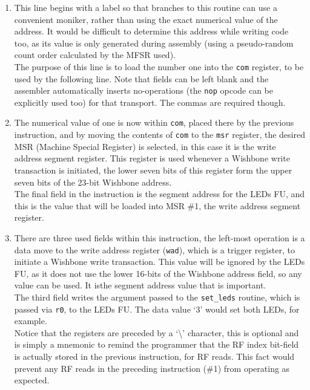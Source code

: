 \begin{enumerate}
  \item This line begins with a label so that branches to this routine can use
  a convenient moniker, rather than using the exact numerical value of the
  address. It would be difficult to determine this address while writing code 
  too, as its value is only generated during assembly (using a pseudo-random
  count order calculated by the MFSR used).  \\
  The purpose of this line is to load the number one into the \texttt{com}
  register, to be used by the following line. Note that fields can be left blank and the
  assembler automatically inserts no-operations (the \texttt{nop} opcode can
  be explicitly used too) for that transport. The commas are required though.
  \item The numerical value of one is now within \texttt{com}, placed there
  by the previous instruction, and by moving the contents of \texttt{com} to the
  \texttt{msr} register, the desired MSR (Machine Special Register) is
  selected, in this case it is the write address segment register. This
  register is used whenever a Wishbone write transaction is initiated, the
  lower seven bits of this register form the upper seven bits of the 23-bit
  Wishbone address. \\
  The final field in the instruction is the segment address for the LEDs FU,
  and this is the value that will be loaded into MSR \#1, the write address
  segment register.
  \item There are three used fields within this instruction, the left-most
  operation is a data move to the write address register (\texttt{wad}), which
  is a trigger register, to initiate a Wishbone write transaction. This value will
  be ignored by the LEDs FU, as it does not use the lower 16-bits of the
  Wishbone address field, so any value can be used. It isthe segment address value that is important. \\
  The third field writes the argument passed to the \texttt{set\_leds} routine,
  which is passed via \texttt{r0}, to the LEDs FU. The data value `3' would set
  both LEDs, for example. \\
  Notice that the registers are preceded by a `\textbackslash' character, this
  is optional and is simply a mnemonic to remind the programmer that the RF
  index bit-field is actually stored in the previous instruction, for RF reads.
  This fact would prevent any RF reads in the preceding instruction (\#1) from
  operating as expected.	\\

\end{enumerate}
